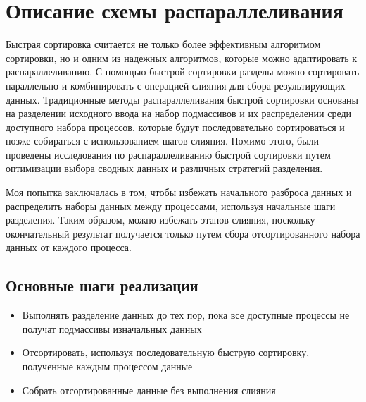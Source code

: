 \documentclass{report}
\begin{document}
\section*{Описание схемы распараллеливания}
Быстрая сортировка считается не только более эффективным алгоритмом сортировки, но и одним из надежных алгоритмов, которые можно адаптировать к распараллеливанию. С помощью быстрой сортировки разделы можно сортировать параллельно и комбинировать с операцией слияния для сбора результирующих данных. Традиционные методы распараллеливания быстрой сортировки основаны на разделении исходного ввода на набор подмассивов и их распределении среди доступного набора процессов, которые будут последовательно сортироваться и позже собираться с использованием шагов слияния. Помимо этого, были проведены исследования по распараллеливанию быстрой сортировки путем оптимизации выбора сводных данных и различных стратегий разделения. 
\par Моя попытка заключалась в том, чтобы избежать начального разброса данных и распределить наборы данных между процессами, используя начальные шаги разделения. Таким образом, можно избежать этапов слияния, поскольку окончательный результат получается только путем сбора отсортированного набора данных от каждого процесса.

\subsection*{Основные шаги реализации}
\begin{itemize}
    \item Выполнять разделение данных до тех пор, пока все доступные процессы не получат подмассивы изначальных данных
    \item Отсортировать, используя последовательную быструю сортировку, полученные каждым процессом данные
    \item Собрать отсортированные данные без выполнения слияния
\end{itemize}
\end{document}
